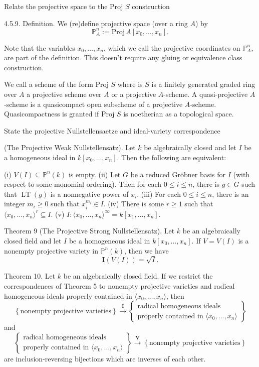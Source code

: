 Relate the projective space to the \( \text{Proj } S \) construction

4.5.9. Definition. We (re)define projective space (over a ring \(A\)) by
\[
\mathbb{P}_A^n := \mathrm{Proj}\, A[x_0, \ldots, x_n].
\]

Note that the variables \(x_0, \ldots, x_n\), which we call the projective coordinates on \(\mathbb{P}_A^n\), are part of the definition. 
This doesn't require any gluing or equivalence class construction.

We call a scheme of the form \( \text{Proj } S \) where is \( S \) is a finitely generated graded ring over \( A \)
a projective scheme over \( A \) or a projective \( A \)-scheme. A quasi-projective \( A \)-scheme is a quasicompact 
open subscheme of a projective \( A \)-scheme. 
Quasicompactness is granted if \( \text{Proj } S \) is noetherian as a topological space.



State the projective Nullstellensaetze and ideal-variety correspondence 

(The Projective Weak Nullstellensatz). 
Let \(k\) be algebraically closed and let \(I\) be a homogeneous ideal in \(k[x_0, \ldots, x_n]\). Then the following are equivalent:

(i) \(V(I) \subseteq \mathbb{P}^n(k)\) is empty.
(ii) Let \(G\) be a reduced Gröbner basis for \(I\) (with respect to some monomial ordering). Then for each \(0 \leq i \leq n\), there is \(g \in G\) such that \(\operatorname{LT}(g)\) is a nonnegative power of \(x_i\).
(iii) For each \(0 \leq i \leq n\), there is an integer \(m_i \geq 0\) such that \(x_i^{m_i} \in I\).
(iv) There is some \(r \geq 1\) such that \(\langle x_0, \ldots, x_n \rangle^{r} \subseteq I\).
(v) \(I : \langle x_0, \ldots, x_n \rangle^{\infty} = k[x_1, \ldots, x_n]\).

Theorem 9 (The Projective Strong Nullstellensatz). 
Let \(k\) be an algebraically closed field and let \(I\) be a homogeneous ideal in \(k[x_0, \ldots, x_n]\). 
If \(V = V(I)\) is a nonempty projective variety in \(\mathbb{P}^n(k)\), then we have
\[
\mathbf{I}(V(I)) = \sqrt{I}.
\]


Theorem 10. Let \(k\) be an algebraically closed field. 
If we restrict the correspondences of Theorem 5 to nonempty projective varieties and radical homogeneous ideals properly contained in 
\(\langle x_0, \ldots, x_n \rangle\), then
\[
\left\{ \text{nonempty projective varieties} \right\}
\overset{\mathbf{I}}{\longrightarrow}
\left\{ \begin{array}{c} \text{radical homogeneous ideals} \\ \text{properly contained in }\langle x_0, \ldots, x_n\rangle \end{array} \right\}
\]
and
\[
\left\{ \begin{array}{c} \text{radical homogeneous ideals} \\ \text{properly contained in }\langle x_0, \ldots, x_n\rangle \end{array} \right\}
\overset{\mathbf{V}}{\longrightarrow}
\left\{ \text{nonempty projective varieties} \right\}
\]
are inclusion-reversing bijections which are inverses of each other.
